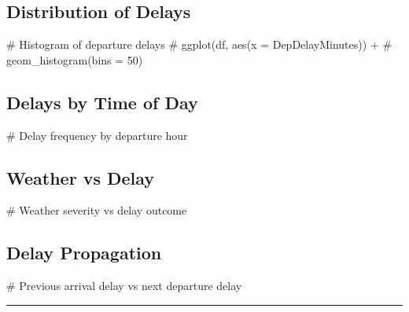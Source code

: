 \documentclass[
  letterpaper,
  DIV=11,
  numbers=noendperiod]{scrartcl}
\newenvironment{Shaded}{\begin{snugshade}}{\end{snugshade}}
\newcommand{\CommentTok}[1]{\textcolor[rgb]{0.37,0.37,0.37}{#1}}
\begin{document}
\subsection{Distribution of Delays}\label{distribution-of-delays}

\begin{Shaded}
\begin{Highlighting}[]
\CommentTok{\# Histogram of departure delays}
\CommentTok{\# ggplot(df, aes(x = DepDelayMinutes)) +}
\CommentTok{\#   geom\_histogram(bins = 50)}
\end{Highlighting}
\end{Shaded}

\subsection{Delays by Time of Day}\label{delays-by-time-of-day}

\begin{Shaded}
\begin{Highlighting}[]
\CommentTok{\# Delay frequency by departure hour}
\end{Highlighting}
\end{Shaded}

\subsection{Weather vs Delay}\label{weather-vs-delay}

\begin{Shaded}
\begin{Highlighting}[]
\CommentTok{\# Weather severity vs delay outcome}
\end{Highlighting}
\end{Shaded}

\subsection{Delay Propagation}\label{delay-propagation}

\begin{Shaded}
\begin{Highlighting}[]
\CommentTok{\# Previous arrival delay vs next departure delay}
\end{Highlighting}
\end{Shaded}

\begin{center}\rule{0.5\linewidth}{0.5pt}\end{center}
\end{document}
